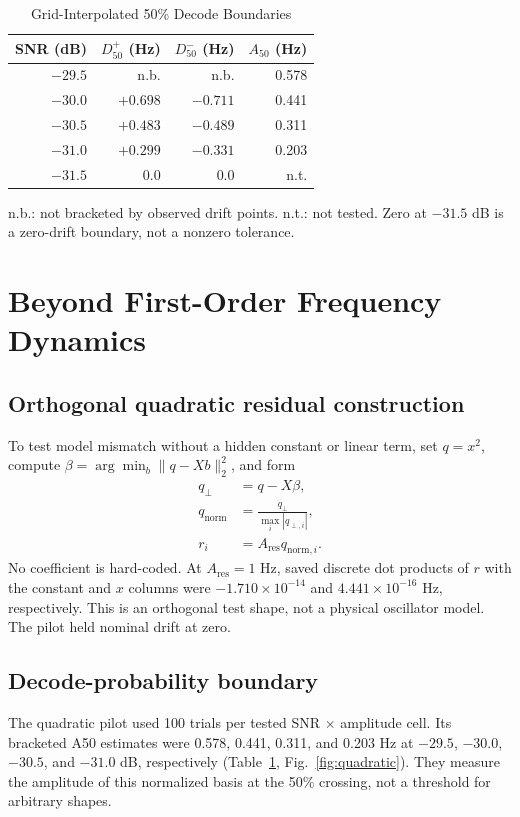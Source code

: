 \documentclass{ieeeaccess}
\begin{document}
\begin{table}[t]
\caption{Grid-Interpolated 50\% Decode Boundaries}
\label{tab:boundaries}
\centering\footnotesize
\begin{tabular}{rrrr}
\toprule
SNR (dB) & $D_{50}^{+}$ (Hz) & $D_{50}^{-}$ (Hz) & $A_{50}$ (Hz) \\
\midrule
$-29.5$ & n.b. & n.b. & 0.578 \\
$-30.0$ & $+0.698$ & $-0.711$ & 0.441 \\
$-30.5$ & $+0.483$ & $-0.489$ & 0.311 \\
$-31.0$ & $+0.299$ & $-0.331$ & 0.203 \\
$-31.5$ & 0.0 & 0.0 & n.t. \\
\bottomrule
\end{tabular}
\vspace{2pt}
\parbox{\columnwidth}{\footnotesize n.b.: not bracketed by observed drift points. n.t.: not tested. Zero at $-31.5$ dB is a zero-drift boundary, not a nonzero tolerance.}
\end{table}

\section{Beyond First-Order Frequency Dynamics}
\subsection{Orthogonal quadratic residual construction}
To test model mismatch without a hidden constant or linear term, set $q=x^2$, compute $\beta=\arg\min_b\|q-Xb\|_2^2$, and form
\begin{equation}
\begin{aligned}
q_{\perp}&=q-X\beta,\\
q_{\mathrm{norm}}&=\frac{q_{\perp}}{\max_i|q_{\perp,i}|},\\
r_i&=A_{\mathrm{res}}q_{\mathrm{norm},i}.
\end{aligned}
\label{eq:quadratic}
\end{equation}
No coefficient is hard-coded. At $A_{\mathrm{res}}=1$ Hz, saved discrete dot products of $r$ with the constant and $x$ columns were $-1.710\times10^{-14}$ and $4.441\times10^{-16}$ Hz, respectively. This is an orthogonal test shape, not a physical oscillator model. The pilot held nominal drift at zero.

\subsection{Decode-probability boundary}
The quadratic pilot used 100 trials per tested SNR $\times$ amplitude cell. Its bracketed A50 estimates were 0.578, 0.441, 0.311, and 0.203 Hz at $-29.5$, $-30.0$, $-30.5$, and $-31.0$ dB, respectively (Table~\ref{tab:boundaries}, Fig.~\ref{fig:quadratic}). They measure the amplitude of this normalized basis at the 50\% crossing, not a threshold for arbitrary shapes.
\end{document}
